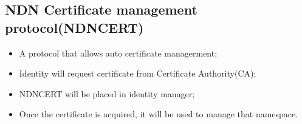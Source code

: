 \documentclass[a0,portrait]{poster}
\begin{document}
\begin{multicols}{2}
\subsection*{NDN Certificate management protocol(NDNCERT)\cite{zhang2017ndncert}}
\begin{itemize}
	\item A protocol that allows auto certificate managerment;
	\item Identity will request certificate from Certificate Authority(CA);
	\item NDNCERT will be placed in identity manager;
	\item Once the certificate is acquired, it will be used to manage that namespace.
\end{itemize}





\end{multicols}
\end{document}
